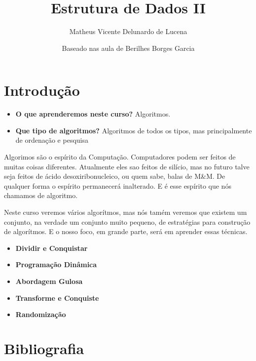 \documentclass{article}
\begin{document}
\title{Estrutura de Dados II}
\author{Matheus Vicente Delunardo de Lucena\\
\and
Baseado nas aula de Berilhes Borges Garcia}
\date{}



\maketitle





\section{Introdução}

\begin{itemize}
\item \textbf{O que aprenderemos neste curso?} \textnormal{Algoritmos.} 
\item \textbf{Que tipo de algoritmos?} \textnormal{Algoritmos de todos os tipos, mas principalmente de ordenação e pesquisa} 
\end{itemize}

\textnormal{Algorimos são o espírito da Computação. Computadores podem ser feitos de muitas coisas diferentes. Atualmente eles sao feitos de silício, mas no futuro talve seja feitos de ácido desoxiribonucleico, ou quem sabe, balas de M\&M. De qualquer forma o espírito permanecerá inalterado. E é esse espírito que nós chamamos de algoritmo.}

\textnormal{Neste curso veremos vários algorítmos, mas nós tamém veremos que existem um conjunto, na verdade um conjunto muito pequeno, de estratégias para construção de algorítmos. E o nosso foco, em grande parte, será em aprender essas técnicas.}


\begin{itemize}
\item \textbf{Dividir e Conquistar}
\item \textbf{Programação Dinâmica}
\item \textbf{Abordagem Gulosa}
\item \textbf{Transforme e Conquiste}
\item \textbf{Randomização}

\end {itemize}



\section{Bibliografia}
\end{document}

